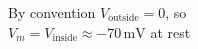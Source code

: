 \documentclass[preview]{standalone}
\begin{document}
\begin{center}
By convention $V_{\mathrm{outside}} = 0$, so\\$V_m = V_{\mathrm{inside}} \approx -70\,\mathrm{mV}$ at rest
\end{center}
\end{document}
